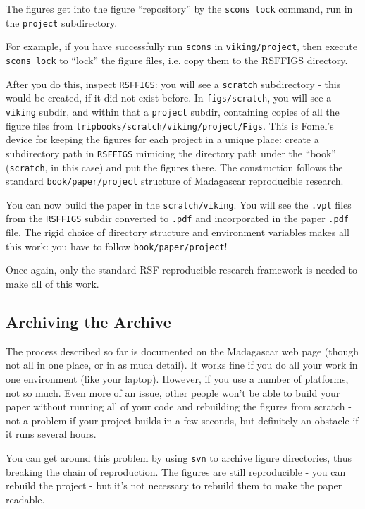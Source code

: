 The figures get into the figure ``repository'' by the {\tt scons lock} command, run in the {\tt project} subdirectory. 

For example, if you have successfully run {\tt scons} in {\tt viking/project}, then execute {\tt scons lock} to ``lock'' the figure files, i.e. copy them to the RSFFIGS directory. 

After you do this, inspect {\tt RSFFIGS}: you will see a {\tt scratch} subdirectory - this would be created, if it did not exist before. In {\tt figs/scratch}, you will see a {\tt viking} subdir, and within that a {\tt project} subdir, containing copies of all the figure files from {\tt tripbooks/scratch/viking/project/Figs}. This is Fomel's device for keeping the figures for each project in a unique place: create a subdirectory path in {\tt RSFFIGS} mimicing the directory path under the ``book'' ({\tt scratch}, in this case) and put the figures there. The construction follows the standard {\tt book/paper/project} structure of Madagascar reproducible research.

You can now build the paper in the {\tt scratch/viking}. You will see the {\tt .vpl} files from the {\tt RSFFIGS} subdir converted to {\tt .pdf} and incorporated in the paper {\tt .pdf} file. The rigid choice of directory structure and environment variables makes all this work: you have to follow {\tt book/paper/project}!

Once again, only the standard RSF reproducible research framework is needed to make all of this work.
 
\subsection{Archiving the Archive}
The process described so far is documented on the Madagascar web page (though not all in one place, or in as much detail). It works fine if you do all your work in one environment (like your laptop). However, if you use a number of platforms, not so much. Even more of an issue, other people won't be able to build your paper without running all of your code and rebuilding the figures from scratch - not a problem if your project builds in a few seconds, but definitely an obstacle if it runs several hours.

You can get around this problem by using {\tt svn} to archive figure directories, thus breaking the chain of reproduction. The figures are still reproducible - you can rebuild the project - but it's not necessary to rebuild them to make the paper readable. 

